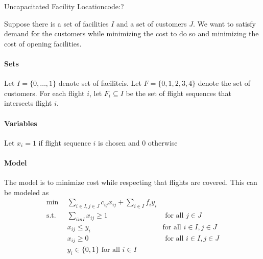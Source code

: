 




\begin{examplewithcode}{Uncapacitated Facility Location\footnotemark}{code:?}
\label{example:UFL}

Suppose there is a set of facilities $I$ and a set of customers $J$.  We want to satisfy demand for the customers while minimizing the cost to do so and minimizing the cost of opening facilities.



\paragraph{Sets}
Let $I = \{0,\dots, 1\}$ denote set of faciliteis.
Let $F = \{0,1,2,3,4\}$ denote the set of customers.
For each flight $i$, let $F_i \subseteq I$ be the set of flight sequences that intersects flight $i$.
\paragraph{Variables}
Let $x_i = 1$ if flight sequence $i$ is chosen and $0$ otherwise
\paragraph{Model}
The model is to minimize cost while respecting that flights are covered.  This can be modeled as 
\begin{align*}
\min \ \ & \sum_{i \in I, j \in J}c_{ij} x_{ij} + \sum_{i\in I}f_{i} y_{i}\\
\text{s.t.} \ \ &  \sum_{i in I} x_{ij} \geq 1 & \text{ for all } j \in J\\
& x_{ij} \leq y_{i} & \text{for all } i \in I, j \in J\\
& x_{ij} \geq 0  & \text{ for all } i \in I, j \in J\\
& y_{i} \in \{0,1\} \text{ for all } i \in I
\end{align*}



\end{examplewithcode}
